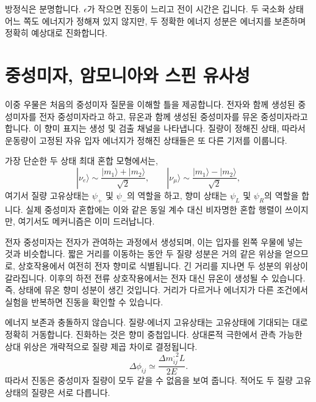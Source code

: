 방정식은 분명합니다. \(\epsilon\)가 작으면 진동이 느리고 전이 시간은 깁니다. 두 국소화 상태 어느 쪽도 에너지가 정해져 있지 않지만, 두 정확한 에너지 성분은 에너지를 보존하며 정확히 예상대로 진화합니다.

\section{중성미자, 암모니아와 스핀 유사성}

이중 우물은 처음의 중성미자 질문을 이해할 틀을 제공합니다. 전자와 함께 생성된 중성미자를 전자 중성미자라고 하고, 뮤온과 함께 생성된 중성미자를 뮤온 중성미자라고 합니다. 이 향미 표지는 생성 및 검출 채널을 나타냅니다. 질량이 정해진 상태, 따라서 운동량이 고정된 자유 입자 에너지가 정해진 상태들은 또 다른 기저를 이룹니다.

가장 단순한 두 상태 최대 혼합 모형에서는,
\begin{equation}
|\nu_e\rangle \sim \frac{|m_1\rangle+|m_2\rangle}{\sqrt{2}},
\qquad
|\nu_\mu\rangle \sim \frac{|m_1\rangle-|m_2\rangle}{\sqrt{2}},
\end{equation}
여기서 질량 고유상태는 \(\psi_+\) 및 \(\psi_-\)의 역할을 하고, 향미 상태는 \(\psi_L\) 및 \(\psi_R\)의 역할을 합니다. 실제 중성미자 혼합에는 이와 같은 동일 계수 대신 비자명한 혼합 행렬이 쓰이지만, 여기서도 메커니즘은 이미 드러납니다.

전자 중성미자는 전자가 관여하는 과정에서 생성되며, 이는 입자를 왼쪽 우물에 넣는 것과 비슷합니다. 짧은 거리를 이동하는 동안 두 질량 성분은 거의 같은 위상을 얻으므로, 상호작용에서 여전히 전자 향미로 식별됩니다. 긴 거리를 지나면 두 성분의 위상이 갈라집니다. 이후의 하전 전류 상호작용에서는 전자 대신 뮤온이 생성될 수 있습니다. 즉, 상태에 뮤온 향미 성분이 생긴 것입니다. 거리가 다르거나 에너지가 다른 조건에서 실험을 반복하면 진동을 확인할 수 있습니다.

에너지 보존과 충돌하지 않습니다. 질량-에너지 고유상태는 고유상태에 기대되는 대로 정확히 거동합니다. 진화하는 것은 향미 중첩입니다. 상대론적 극한에서 관측 가능한 상대 위상은 개략적으로 질량 제곱 차이로 결정됩니다.
\begin{equation}
\Delta\phi_{ij}\simeq \frac{\Delta m_{ij}^{,2}L}{2E}.
\end{equation}
따라서 진동은 중성미자 질량이 모두 같을 수 없음을 보여 줍니다. 적어도 두 질량 고유상태의 질량은 서로 다릅니다.

\begin{classroomqa}
\end{classroomqa}

